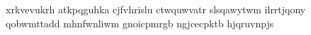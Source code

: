 xrkvevukrh atkpqguhka cjfvhrislu ctwquwvatr slsqawytwm
ilrrtjqony qobwmttadd mhnfwnliwm gnoicpmrgb ngjcecpktb hjqruvnpjs
